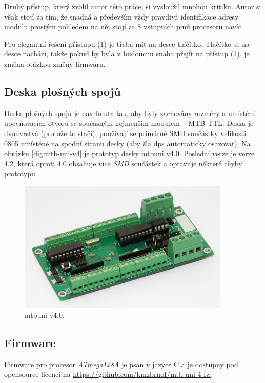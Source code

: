 Druhý přístup, který zvolil autor této práce, si vysloužil mnohou kritiku.
Autor si však stojí za tím, že snadná a především vždy pravdivá identifikace
adresy modulu prostým pohledem na něj stojí za 8 vstupních pinů procesoru navíc.

Pro elegantní řešení přístupu (1) je třeba mít na desce tlačítko. Tlačítko se
na desce nachází, takže pokud by byla v budoucnu snaha přejít na přístup (1),
je změna otázkou změny firmwaru.

\subsection{Deska plošných spojů}

Deska plošných spojů je navrhnuta tak, aby byly zachovány rozměry a umístění
upevňovacích otvorů se současným nejmenším modulem – MTB-TTL. Deska je dvouvrstvá
(protože to stačí), používají se primárně SMD součástky velikosti 0805 umístěné
na spodní stranu desky (aby šla \gls{dps} automaticky osazovat). Na obrázku
\ref{dig:mtb-uni-v4} je prototyp desky \gls{mtbuni} v4.0. Poslední verze je
verze 4.2, která oproti 4.0 obsahuje více \textit{SMD} součástek a opravuje
některé chyby prototypu.

\begin{figure}[ht]
\includegraphics[width=0.9\textwidth]{data/uni-v40-screw-all.jpg}
\caption{\gls{mtbuni} v4.0.}
\label{fig:mtb-uni-v4}
\end{figure}

\subsection{Firmware}

Firmware pro procesor \textit{ATmega128A} je psán v jazyce C a je dostupný
pod opensource licencí na \url{https://github.com/kmzbrnoI/mtb-uni-4-fw}.

